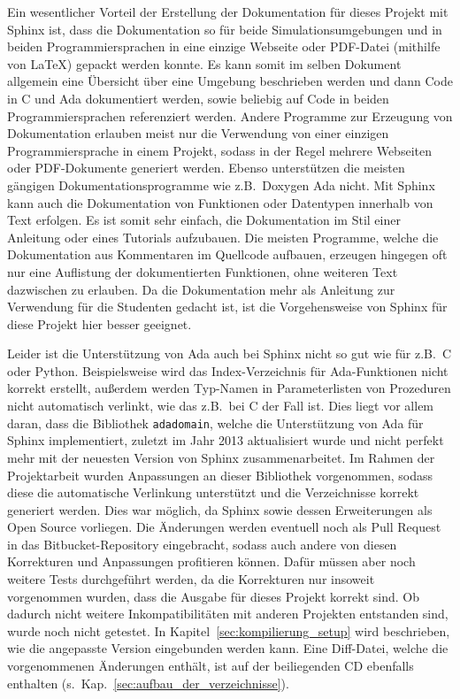 \documentclass[oneside]{elaboration}
\begin{document}
Ein wesentlicher Vorteil der Erstellung der Dokumentation für dieses Projekt mit
Sphinx ist, dass die Dokumentation so für beide Simulationsumgebungen und in
beiden Programmiersprachen in eine einzige Webseite oder PDF-Datei (mithilfe von
LaTeX) gepackt werden konnte. Es kann somit im selben Dokument allgemein eine
Übersicht über eine Umgebung beschrieben werden und dann Code in C und Ada
dokumentiert werden, sowie beliebig auf Code in beiden Programmiersprachen
referenziert werden. Andere Programme zur Erzeugung von Dokumentation erlauben
meist nur die Verwendung von einer einzigen Programmiersprache in einem Projekt,
sodass in der Regel mehrere Webseiten oder PDF-Dokumente generiert werden.
Ebenso unterstützen die meisten gängigen Dokumentationsprogramme wie z.B.\
Doxygen Ada nicht. Mit Sphinx kann auch die Dokumentation von Funktionen oder
Datentypen innerhalb von Text erfolgen. Es ist somit sehr einfach, die
Dokumentation im Stil einer Anleitung oder eines Tutorials aufzubauen. Die
meisten Programme, welche die Dokumentation aus Kommentaren im Quellcode
aufbauen, erzeugen hingegen oft nur eine Auflistung der dokumentierten
Funktionen, ohne weiteren Text dazwischen zu erlauben. Da die Dokumentation mehr
als Anleitung zur Verwendung für die Studenten gedacht ist, ist die
Vorgehensweise von Sphinx für diese Projekt hier besser geeignet.

Leider ist die Unterstützung von Ada auch bei Sphinx nicht so gut wie für z.B.\
C oder Python. Beispielsweise wird das Index-Verzeichnis für Ada-Funktionen
nicht korrekt erstellt, außerdem werden Typ-Namen in Parameterlisten von
Prozeduren nicht automatisch verlinkt, wie das z.B.\ bei C der Fall ist. Dies
liegt vor allem daran, dass die Bibliothek \texttt{adadomain}, welche die
Unterstützung von Ada für Sphinx implementiert, zuletzt im Jahr 2013
aktualisiert wurde und nicht perfekt mehr mit der neuesten Version von Sphinx
zusammenarbeitet. Im Rahmen der Projektarbeit wurden Anpassungen an dieser
Bibliothek vorgenommen, sodass diese die automatische Verlinkung unterstützt und
die Verzeichnisse korrekt generiert werden. Dies war möglich, da Sphinx sowie
dessen Erweiterungen als Open Source vorliegen. Die Änderungen werden eventuell
noch als Pull Request in das Bitbucket-Repository eingebracht, sodass auch
andere von diesen Korrekturen und Anpassungen profitieren können. Dafür müssen
aber noch weitere Tests durchgeführt werden, da die Korrekturen nur insoweit
vorgenommen wurden, dass die Ausgabe für dieses Projekt korrekt sind. Ob dadurch
nicht weitere Inkompatibilitäten mit anderen Projekten entstanden sind, wurde
noch nicht getestet. In Kapitel~\ref{sec:kompilierung_setup} wird beschrieben,
wie die angepasste Version eingebunden werden kann. Eine Diff-Datei, welche die
vorgenommenen Änderungen enthält, ist auf der beiliegenden CD ebenfalls
enthalten (s.\ Kap.~\ref{sec:aufbau_der_verzeichnisse}).
\end{document}
